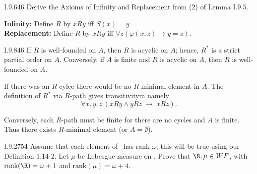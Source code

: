 \begin{lexcopy}{I.9.6}{46}
  Derive the Axioms of Infinity and Replacement from (2) of Lemma I.9.5.
\end{lexcopy}
\textbf{Infinity:} Define $R$ by \(xRy\) iff \(S(x) = y\)
\\
\textbf{Replacement:} Define $R$ by \(xRy\) iff
\(\forall z(\varphi(x, z) \to y = z)\).

\begin{lexcopy}{I.9.8}{46}
  If $R$ is well-founded on $A$, then $R$ is acyclic on $A$; hence, \(R^*\)
  is a strict partial order on $A$.
  Conversely, if $A$ is finite and $R$ is acyclic on $A$,
then $R$ is well-founded on $A$.
\end{lexcopy}
If there was an $R$-cylce there would be no $R$ minimal element in $A$.
The definition of \(R^*\) via $R$-path gives transitivitym namely
\begin{equation*}
\forall x,y,z\,\left(xRy \wedge yRz \;\to\; xRz\right).
\end{equation*}

Conversely, each $R$-path must be finite for there are no cycles
and $A$ is finite. Thus there exists $R$-minimal element
(or \(A=\emptyset\)).

\begin{lexcopy}{I.9.27}{54}
  Assume that each element of \R\ has rank \(\omega\);
  this will be true
using our Definition 1.14-2. Let \(\mu\) be Lebesgue measure on \R. Prove that
\(\R,\mu \in WF\), with \(\textrm{rank}(\R) = \omega + 1\)
and \(\textrm{rank}(\mu) = \omega + 4\).
\end{lexcopy}
\unfinished
